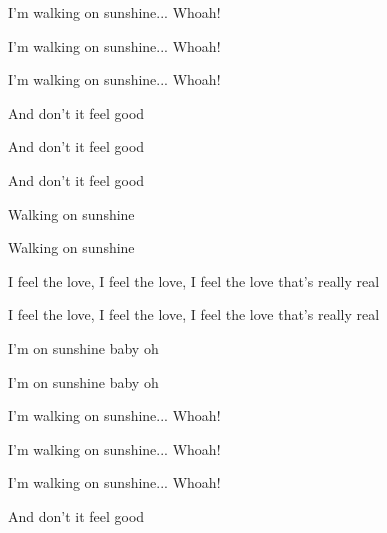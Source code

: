 \begin{song}
\bigskip

I'm walking on sunshine... Whoah! \par
I'm walking on sunshine... Whoah! \par
I'm walking on sunshine... Whoah! \par
And don't it feel good    \par
And don't it feel good    \par
And don't it feel good    \par

\bigskip

    \par

\bigskip

Walking on sunshine    \par
Walking on sunshine    \par

\bigskip

I feel the love, I feel the love, I feel the love that's really real \par
I feel the love, I feel the love, I feel the love that's really real \par

\bigskip

I'm on sunshine baby oh  \par
I'm on sunshine baby oh  \par

\bigskip

I'm walking on sunshine... Whoah! \par
I'm walking on sunshine... Whoah! \par
I'm walking on sunshine... Whoah! \par
And don't it feel good \par

\end{song}
